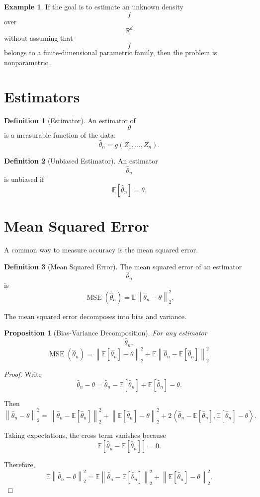 \documentclass[12pt,oneside]{book}
\numberwithin{equation}{section}
\theoremstyle{definition}
\newtheorem{definition}{Definition}[section]
\newtheorem{example}{Example}[section]
\theoremstyle{plain}
\newtheorem{proposition}{Proposition}[section]
\theoremstyle{remark}
\newcommand{\R}{\mathbb{R}}
\newcommand{\E}{\mathbb{E}}
\newcommand{\norm}[1]{\left\lVert #1 \right\rVert}
\begin{document}
\begin{example}
If the goal is to estimate an unknown density
\[
f
\]
over
\[
\R^d
\]
without assuming that
\[
f
\]
belongs to a finite-dimensional parametric family, then the problem is nonparametric.
\end{example}

\section{Estimators}

\begin{definition}[Estimator]
An estimator of
\[
\theta
\]
is a measurable function of the data:
\[
\widehat{\theta}_n
=
g(Z_1,\dots,Z_n).
\]
\end{definition}

\begin{definition}[Unbiased Estimator]
An estimator
\[
\widehat{\theta}_n
\]
is unbiased if
\[
\E[\widehat{\theta}_n]=\theta.
\]
\end{definition}

\section{Mean Squared Error}

A common way to measure accuracy is the mean squared error.

\begin{definition}[Mean Squared Error]
The mean squared error of an estimator
\[
\widehat{\theta}_n
\]
is
\[
\operatorname{MSE}(\widehat{\theta}_n)
=
\E\norm{\widehat{\theta}_n-\theta}_2^2.
\]
\end{definition}

The mean squared error decomposes into bias and variance.

\begin{proposition}[Bias-Variance Decomposition]
For any estimator
\[
\widehat{\theta}_n,
\]
\[
\operatorname{MSE}(\widehat{\theta}_n)
=
\norm{\E[\widehat{\theta}_n]-\theta}_2^2
+
\E\norm{\widehat{\theta}_n-\E[\widehat{\theta}_n]}_2^2.
\]
\end{proposition}

\begin{proof}
Write
\[
\widehat{\theta}_n-\theta
=
\widehat{\theta}_n-\E[\widehat{\theta}_n]
+
\E[\widehat{\theta}_n]-\theta.
\]

Then
\[
\norm{\widehat{\theta}_n-\theta}_2^2
=
\norm{\widehat{\theta}_n-\E[\widehat{\theta}_n]}_2^2
+
\norm{\E[\widehat{\theta}_n]-\theta}_2^2
+
2
\left\langle
\widehat{\theta}_n-\E[\widehat{\theta}_n],
\E[\widehat{\theta}_n]-\theta
\right\rangle.
\]

Taking expectations, the cross term vanishes because
\[
\E[\widehat{\theta}_n-\E[\widehat{\theta}_n]]=0.
\]

Therefore,
\[
\E\norm{\widehat{\theta}_n-\theta}_2^2
=
\E\norm{\widehat{\theta}_n-\E[\widehat{\theta}_n]}_2^2
+
\norm{\E[\widehat{\theta}_n]-\theta}_2^2.
\]
\end{proof}
\end{document}
